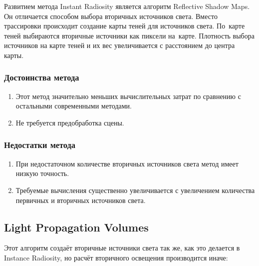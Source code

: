 \documentclass[12pt,fleqn]{article}
\begin{document}
Развитием метода Instant Radiosity является алгоритм Reflective Shadow Maps. Он отличается способом выбора вторичных источников света. Вместо трассировки происходит создание карты теней для источников света. По~карте теней выбираются вторичные источники как пиксели на~карте. Плотность выбора источников на карте теней и их вес увеличивается с расстоянием до центра карты.

\subsubsection{Достоинства метода}

\begin{enumerate}

\item Этот метод значительно меньших вычислительных затрат по сравнению с остальными современными методами.

\item Не требуется предобработка сцены.

\end{enumerate}

\subsubsection{Недостатки метода}

\begin{enumerate}

\item При недостаточном количестве вторичных источников света метод имеет низкую точность.

\item Требуемые вычисления существенно увеличивается с увеличением количества первичных и вторичных источников света.

\end{enumerate}

\subsection{Light Propagation Volumes}

Этот алгоритм создаёт вторичные источники света так же, как это делается в Instance Radiosity, но расчёт вторичного освещения производится иначе:
\end{document}
